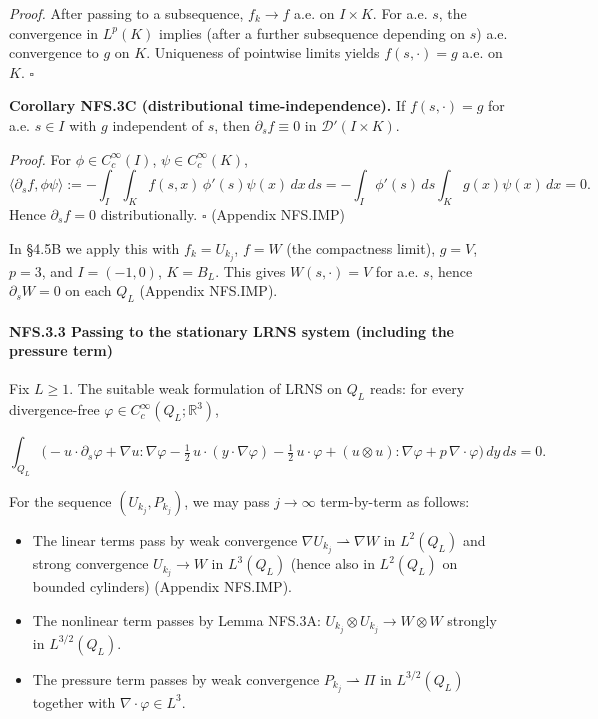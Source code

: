 \documentclass[
  11pt,
]{article}
\providecommand{\tightlist}{%
  \setlength{\itemsep}{0pt}\setlength{\parskip}{0pt}}
\begin{document}
\emph{Proof.} After passing to a subsequence, \(f_k\to f\) a.e. on \(I\times K\). For a.e. \(s\), the convergence in \(L^p(K)\) implies (after a further subsequence depending on \(s\)) a.e. convergence to \(g\) on \(K\). Uniqueness of pointwise limits yields \(f(s,\cdot)=g\) a.e. on \(K\). \(\square\)

\textbf{Corollary NFS.3C (distributional time-independence).} If \(f(s,\cdot)=g\) for a.e. \(s\in I\) with \(g\) independent of \(s\), then \(\partial_s f\equiv 0\) in \(\mathcal D'(I\times K)\).

\emph{Proof.} For \(\phi\in C_c^\infty(I)\), \(\psi\in C_c^\infty(K)\), \[
\langle \partial_s f,\phi\psi\rangle := -\int_I\!\!\int_K f(s,x)\,\phi'(s)\psi(x)\,dx\,ds
= -\int_I \phi'(s)\,ds \int_K g(x)\psi(x)\,dx = 0.
\] Hence \(\partial_s f=0\) distributionally. \(\square\) (Appendix NFS.IMP)

In §4.5B we apply this with \(f_k=U_{k_j}\), \(f=W\) (the compactness limit), \(g=V\), \(p=3\), and \(I=(-1,0)\), \(K=B_L\). This gives \(W(s,\cdot)=V\) for a.e. \(s\), hence \(\partial_s W=0\) on each \(Q_L\) (Appendix NFS.IMP).

\hypertarget{nfs.3.3-passing-to-the-stationary-lrns-system-including-the-pressure-term}{%
\paragraph{NFS.3.3 Passing to the stationary LRNS system (including the pressure term)}\label{nfs.3.3-passing-to-the-stationary-lrns-system-including-the-pressure-term}}

Fix \(L\ge 1\). The suitable weak formulation of LRNS on \(Q_L\) reads: for every divergence-free \(\varphi\in C_c^\infty(Q_L;\mathbb R^3)\),

\begin{equation}
\int_{Q_L} \Big(-u\cdot \partial_s\varphi + \nabla u:\nabla\varphi - \tfrac12\,u\cdot(y\cdot\nabla\varphi) - \tfrac12\,u\cdot\varphi
+ (u\otimes u):\nabla\varphi + p\,\nabla\cdot\varphi \Big)\,dy\,ds = 0.
\tag{NFS.3.1}
\end{equation}

For the sequence \((U_{k_j},P_{k_j})\), we may pass \(j\to\infty\) term-by-term as follows:

\begin{itemize}
\tightlist
\item
  The linear terms pass by weak convergence \(\nabla U_{k_j}\rightharpoonup \nabla W\) in \(L^2(Q_L)\) and strong convergence \(U_{k_j}\to W\) in \(L^3(Q_L)\) (hence also in \(L^2(Q_L)\) on bounded cylinders) (Appendix NFS.IMP).
\item
  The nonlinear term passes by Lemma NFS.3A: \(U_{k_j}\otimes U_{k_j}\to W\otimes W\) strongly in \(L^{3/2}(Q_L)\).
\item
  The pressure term passes by weak convergence \(P_{k_j}\rightharpoonup \Pi\) in \(L^{3/2}(Q_L)\) together with \(\nabla\cdot\varphi\in L^3\).
\end{itemize}
\end{document}
